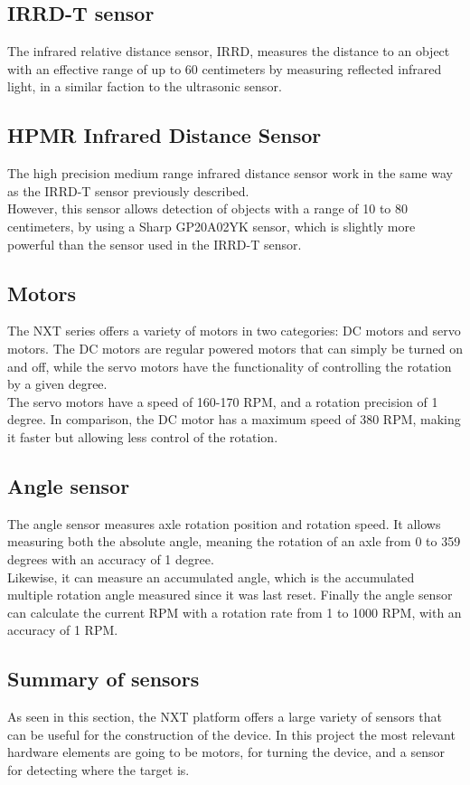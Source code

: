 \subsection*{IRRD-T sensor}
The infrared relative distance sensor, IRRD, measures the distance to an object with an effective range of up to 60 centimeters by measuring reflected infrared light, in a similar faction to the ultrasonic sensor.

\subsection*{HPMR Infrared Distance Sensor}
The high precision medium range infrared distance sensor work in the same way as the IRRD-T sensor previously described.\\
However, this sensor allows detection of objects with a range of 10 to 80 centimeters, by using a Sharp GP20A02YK sensor, which is slightly more powerful than the sensor used in the IRRD-T sensor.

\subsection*{Motors}
The NXT series offers a variety of motors in two categories: DC motors and servo motors.
The DC motors are regular powered motors that can simply be turned on and off, while the servo motors have the functionality of controlling the rotation by a given degree.\\
The servo motors have a speed of 160-170 RPM, and a rotation precision of 1 degree.
In comparison, the DC motor has a maximum speed of 380 RPM, making it faster but allowing less control of the rotation.

\subsection*{Angle sensor}
The angle sensor measures axle rotation position and rotation speed.
It allows measuring both the absolute angle, meaning the rotation of an axle from 0 to 359 degrees with an accuracy of 1 degree.\\
Likewise, it can measure an accumulated angle, which is the accumulated multiple rotation angle measured since it was last reset.
Finally the angle sensor can calculate the current RPM with a rotation rate from 1 to 1000 RPM, with an accuracy of 1 RPM.

\subsection*{Summary of sensors}
As seen in this section, the NXT platform offers a large variety of sensors that can be useful for the construction of the device.
In this project the most relevant hardware elements are going to be motors, for turning  the device, and a sensor for detecting where the target is.
 